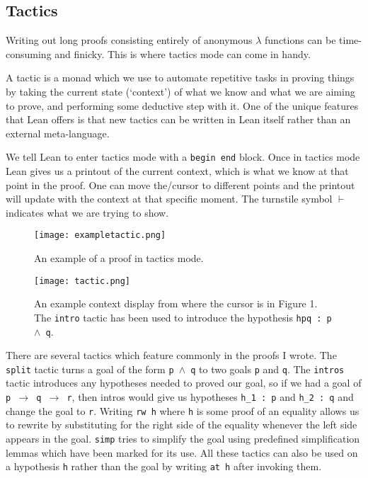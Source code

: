 \documentclass{article}
\newcommand{\ct}{\texttt}
\begin{document}
\subsection{Tactics}
Writing out long proofs consisting entirely of anonymous $\lambda$ functions can be time-consuming and finicky.
This is where tactics mode can come in handy.

A tactic is a monad which we use to automate repetitive tasks in proving things by taking the current state (`context') of what we know and what we are aiming to prove, and performing some deductive step with it.
One of the unique features that Lean offers is that new tactics can be written in Lean itself rather than an external meta-language.

We tell Lean to enter tactics mode with a \ct{begin end} block.
Once in tactics mode Lean gives us a printout of the current context, which is what we know at that point in the proof. 
One can move the/cursor to different points and the printout will update with the context at that specific moment.
The turnstile symbol $\vdash$ indicates what we are trying to show.


\begin{figure}
    \center
    \texttt{[image: exampletactic.png]}
    \caption{An example of a proof in tactics mode.}
    \center
    \texttt{[image: tactic.png]}
    \caption{An example context display from where the cursor is in Figure 1. The \ct{intro} tactic has been used to introduce the hypothesis \ct{hpq : p $\land$ q}.}
\end{figure}

There are several tactics which feature commonly in the proofs I wrote.
The \ct{split} tactic turns a goal of the form \ct{p $\land$ q} to two goals \ct{p} and \ct{q}.
The \ct{intros} tactic introduces any hypotheses needed to proved our goal, so if we had a goal of \ct{p $\to$ q $\to$ r}, then intros would give us hypotheses \ct{h\_1 :  p} and \ct{h\_2 : q} and change the goal to \ct{r}.
Writing \ct{rw h} where \ct{h} is some proof of an equality allows us to rewrite by substituting for the right side of the equality whenever the left side appears in the goal.
\ct{simp} tries to simplify the goal using predefined simplification lemmas which have been marked for its use.
All these tactics can also be used on a hypothesis \ct{h} rather than the goal by writing \ct{at h} after invoking them.

\FloatBarrier
\end{document}
